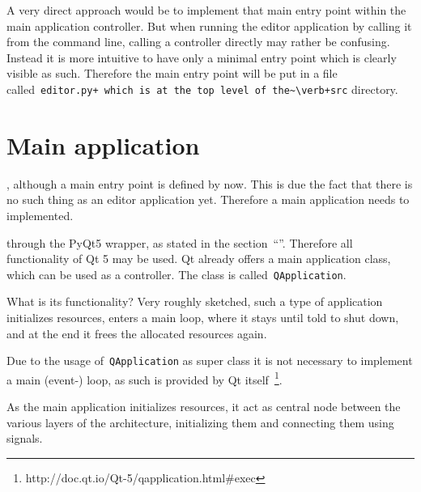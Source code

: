 \documentclass[%
    a4paper,    %
    justified,  %
    nobib,      %
    openany     %
]{tufte-book}
\begin{document}
 A very direct approach
would be to implement that main entry point within the main application
controller. But when running the editor application by calling it from the
command line, calling a controller directly may rather be confusing. Instead it
is more intuitive to have only a minimal entry point which is clearly visible as
such. Therefore the main entry point will be put in a file
called~\verb=editor.py+ which is at the top level of the~\verb+src= directory.

\section{Main application}
\label{appendix:sec:editor:app}

, although a main entry
point is defined by now. This is due the fact that there is no such thing as an
editor application yet. Therefore a main application needs to implemented.

 through the PyQt5 wrapper, as stated in the
section~\enquote{}. Therefore all
functionality of Qt 5 may be used. Qt already offers a main application class,
which can be used as a controller. The class is called~\verb=QApplication=.

 What is
its functionality? Very roughly sketched, such a type of application initializes
resources, enters a main loop, where it stays until told to shut down, and at
the end it frees the allocated resources again.

Due to the usage of~\verb=QApplication= as super class it is not necessary to
implement a main (event-) loop, as such is provided by Qt
itself~\footnote{http://doc.qt.io/Qt-5/qapplication.html\#exec}.

As the main application initializes resources, it act as central node between the
various layers of the architecture, initializing them and connecting them using
signals.\cite[pp. 37 --- 38]{osterwalder-qde-2016}
\end{document}
